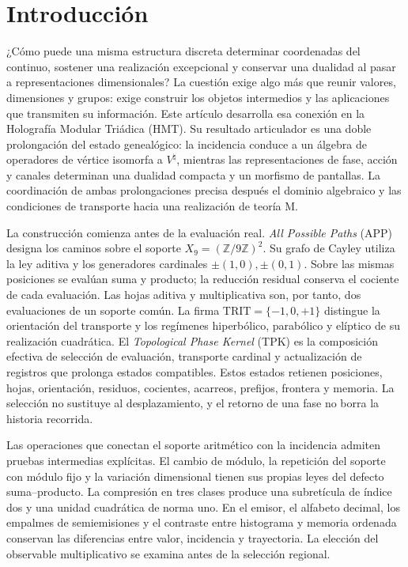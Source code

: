 \section{Introducción}
\label{iv:introduccion}
\begingroup
\fontsize{10.5}{12.8}\selectfont
\setlength{\parskip}{1pt plus .5pt minus .25pt}

¿Cómo puede una misma estructura discreta determinar coordenadas del
continuo, sostener una realización excepcional y conservar una dualidad
al pasar a representaciones dimensionales? La cuestión exige algo más
que reunir valores, dimensiones y grupos: exige construir los objetos
intermedios y las aplicaciones que transmiten su información. Este
artículo desarrolla esa conexión en la Holografía Modular Triádica (HMT).
Su resultado articulador es una doble prolongación del estado
genealógico: la incidencia conduce a un álgebra de operadores de vértice
isomorfa a \(V^\natural\), mientras las representaciones de fase, acción
y canales determinan una dualidad compacta y un morfismo de pantallas.
La coordinación de ambas prolongaciones precisa después el dominio
algebraico y las condiciones de transporte hacia una realización de
teoría M.

La construcción comienza antes de la evaluación real.
\emph{All Possible Paths} (APP) designa los caminos sobre el soporte
\(X_9=(\mathbb Z/9\mathbb Z)^2\). Su grafo de Cayley utiliza la ley
aditiva y los generadores cardinales \(\pm(1,0),\pm(0,1)\). Sobre las
mismas posiciones se evalúan suma y producto; la reducción residual
conserva el cociente de cada evaluación. Las hojas aditiva y
multiplicativa son, por tanto, dos evaluaciones de un soporte común.
La firma \(\mathrm{TRIT}=\{-1,0,+1\}\) distingue la orientación del
transporte y los regímenes hiperbólico, parabólico y elíptico de su
realización cuadrática. El \emph{Topological Phase Kernel} (TPK) es la
composición efectiva de selección de evaluación, transporte cardinal
y actualización de registros que prolonga estados compatibles. Estos
estados retienen posiciones, hojas, orientación, residuos, cocientes,
acarreos, prefijos, frontera y memoria. La selección no sustituye al
desplazamiento, y el retorno de una fase no borra la historia recorrida.

Las operaciones que conectan el soporte aritmético con la incidencia
admiten pruebas intermedias explícitas. El cambio de módulo, la repetición
del soporte con módulo fijo y la variación dimensional tienen sus propias
leyes del defecto suma--producto. La compresión en tres clases produce
una subretícula de índice dos y una unidad cuadrática de norma uno.
En el emisor, el alfabeto decimal, los empalmes de semiemisiones y el
contraste entre histograma y memoria ordenada conservan las diferencias
entre valor, incidencia y trayectoria. La elección del observable
multiplicativo se examina antes de la selección regional.

